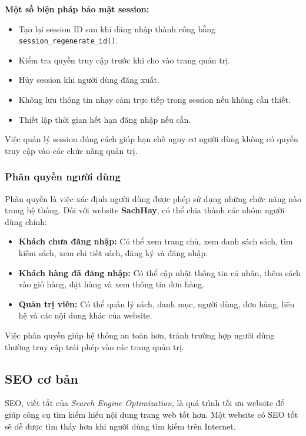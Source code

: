 \textbf{Một số biện pháp bảo mật session:}

\begin{itemize}
	\item Tạo lại session ID sau khi đăng nhập thành công bằng \texttt{session\_regenerate\_id()}.
	\item Kiểm tra quyền truy cập trước khi cho vào trang quản trị.
	\item Hủy session khi người dùng đăng xuất.
	\item Không lưu thông tin nhạy cảm trực tiếp trong session nếu không cần thiết.
	\item Thiết lập thời gian hết hạn đăng nhập nếu cần.
\end{itemize}

Việc quản lý session đúng cách giúp hạn chế nguy cơ người dùng không có quyền truy cập vào các chức năng quản trị.

\subsubsection{Phân quyền người dùng}

Phân quyền là việc xác định người dùng được phép sử dụng những chức năng nào trong hệ thống. Đối với website \textbf{SachHay}, có thể chia thành các nhóm người dùng chính:

\begin{itemize}
	\item \textbf{Khách chưa đăng nhập:} Có thể xem trang chủ, xem danh sách sách, tìm kiếm sách, xem chi tiết sách, đăng ký và đăng nhập.
	\item \textbf{Khách hàng đã đăng nhập:} Có thể cập nhật thông tin cá nhân, thêm sách vào giỏ hàng, đặt hàng và xem thông tin đơn hàng.
	\item \textbf{Quản trị viên:} Có thể quản lý sách, danh mục, người dùng, đơn hàng, liên hệ và các nội dung khác của website.
\end{itemize}

Việc phân quyền giúp hệ thống an toàn hơn, tránh trường hợp người dùng thường truy cập trái phép vào các trang quản trị.

\subsection{SEO cơ bản}

SEO, viết tắt của \textit{Search Engine Optimization}, là quá trình tối ưu website để giúp công cụ tìm kiếm hiểu nội dung trang web tốt hơn. Một website có SEO tốt sẽ dễ được tìm thấy hơn khi người dùng tìm kiếm trên Internet.

